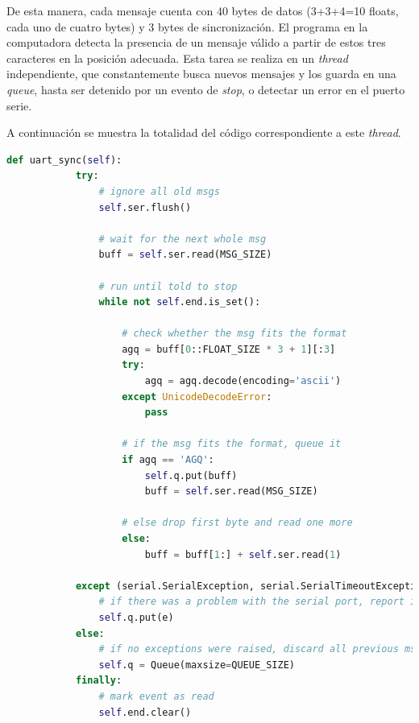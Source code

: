 \documentclass{article}
\begin{document}
De esta manera, cada mensaje cuenta con 40 bytes de datos (3+3+4=10 floats, cada uno de cuatro bytes) y 3 bytes de sincronizaci\'on. El programa en la computadora detecta la presencia de un mensaje v\'alido a partir de estos tres caracteres en la posici\'on  adecuada. Esta tarea se realiza en un \emph{thread} independiente, que constantemente busca nuevos mensajes y los guarda en una \emph{queue}, hasta ser detenido por un evento de \emph{stop}, o detectar un error en el puerto serie.

A continuaci\'on se muestra la totalidad del c\'odigo correspondiente a este \emph{thread}. 

\begin{center}
	\begin{lstlisting}[language=Python]
		def uart_sync(self):
			try:
				# ignore all old msgs
				self.ser.flush()
				
				# wait for the next whole msg
				buff = self.ser.read(MSG_SIZE)
				
				# run until told to stop
				while not self.end.is_set():
					
					# check whether the msg fits the format
					agq = buff[0::FLOAT_SIZE * 3 + 1][:3]
					try:
						agq = agq.decode(encoding='ascii')
					except UnicodeDecodeError:
						pass
					
					# if the msg fits the format, queue it
					if agq == 'AGQ':
						self.q.put(buff)
						buff = self.ser.read(MSG_SIZE)
					
					# else drop first byte and read one more
					else:
						buff = buff[1:] + self.ser.read(1)
			
			except (serial.SerialException, serial.SerialTimeoutException) as e:
				# if there was a problem with the serial port, report it
				self.q.put(e) 
			else:
				# if no exceptions were raised, discard all previous msgs
				self.q = Queue(maxsize=QUEUE_SIZE)
			finally:
				# mark event as read
				self.end.clear()
	\end{lstlisting}
\end{center}
\end{document}
